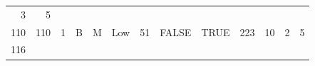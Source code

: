 \documentclass[]{svmono}
\theoremstyle{definition}
\theoremstyle{definition}
\theoremstyle{definition}
\theoremstyle{remark}
\begin{document}
\begin{longtable}[]{@{}rrllllrllrrrr@{}}
\begin{minipage}[t]{0.06\columnwidth}
3\strut
\end{minipage} & \begin{minipage}[t]{0.05\columnwidth}\raggedleft\strut
5\strut
\end{minipage}\tabularnewline
\begin{minipage}[t]{0.03\columnwidth}\raggedleft\strut
110\strut
\end{minipage} & \begin{minipage}[t]{0.04\columnwidth}\raggedleft\strut
110\strut
\end{minipage} & \begin{minipage}[t]{0.04\columnwidth}\raggedright\strut
1\strut
\end{minipage} & \begin{minipage}[t]{0.05\columnwidth}\raggedright\strut
B\strut
\end{minipage} & \begin{minipage}[t]{0.05\columnwidth}\raggedright\strut
M\strut
\end{minipage} & \begin{minipage}[t]{0.07\columnwidth}\raggedright\strut
Low\strut
\end{minipage} & \begin{minipage}[t]{0.03\columnwidth}\raggedleft\strut
51\strut
\end{minipage} & \begin{minipage}[t]{0.08\columnwidth}\raggedright\strut
FALSE\strut
\end{minipage} & \begin{minipage}[t]{0.08\columnwidth}\raggedright\strut
TRUE\strut
\end{minipage} & \begin{minipage}[t]{0.03\columnwidth}\raggedleft\strut
223\strut
\end{minipage} & \begin{minipage}[t]{0.05\columnwidth}\raggedleft\strut
10\strut
\end{minipage} & \begin{minipage}[t]{0.06\columnwidth}\raggedleft\strut
2\strut
\end{minipage} & \begin{minipage}[t]{0.05\columnwidth}\raggedleft\strut
5\strut
\end{minipage}\tabularnewline
\begin{minipage}[t]{0.03\columnwidth}\raggedleft\strut
116\strut
\end{minipage} & \begin{minipage}[t]{0.04\columnwidth}\raggedleft\strut

\end{minipage}
\end{longtable}
\end{document}
